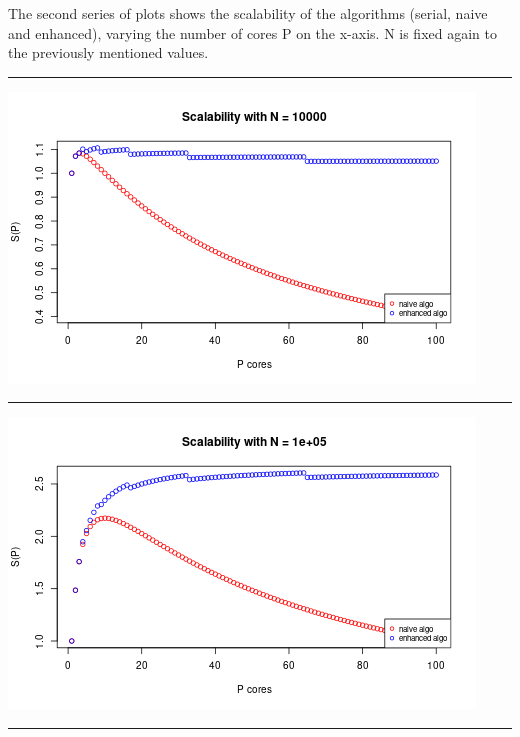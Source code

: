 \documentclass[
  10pt,
]{article}
\begin{document}
The second series of plots shows the scalability of the algorithms
(serial, naive and enhanced), varying the number of cores P on the
x-axis. N is fixed again to the previously mentioned values.

\begin{center}\rule{0.5\linewidth}{0.5pt}\end{center}

\begin{center}\includegraphics{figs/scalability_plots_naive_&_enhanced-1} \end{center}

\begin{center}\rule{0.5\linewidth}{0.5pt}\end{center}

\begin{center}\includegraphics{figs/scalability_plots_naive_&_enhanced-2} \end{center}

\begin{center}\rule{0.5\linewidth}{0.5pt}\end{center}
\end{document}
